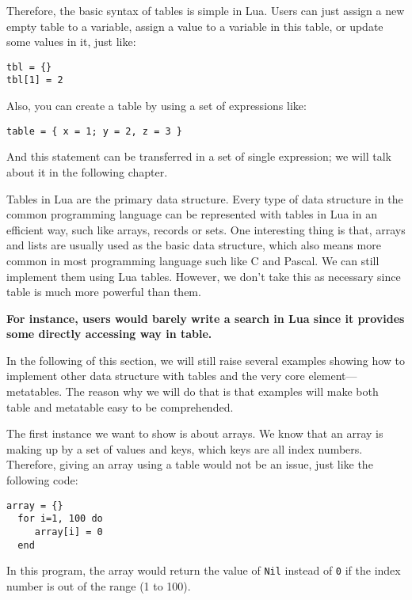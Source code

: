 \documentclass{article}
\begin{document}
Therefore, the basic syntax of tables is simple in Lua. Users can just assign a new empty table to a variable, assign a value to a variable in this table, or update some values in it, just like:
\begin{flushleft}
\tt tbl = \{\} \\
\tt tbl[1] = 2 \\
\end{flushleft}
Also, you can create a table by using a set of expressions like:
\begin{flushleft}
\tt table = \{ x = 1; y = 2, z = 3 \} \\
\end{flushleft}
And this statement can be transferred in a set of single expression; we will talk about it in the following chapter.

Tables in Lua are the primary data structure. Every type of data structure in the common programming language can be represented with tables in Lua in an efficient way, such like arrays, records or sets. One interesting thing is that, arrays and lists are usually used as the basic data structure, which also means more common in most programming language such like C and Pascal. We can still implement them using Lua tables. However, we don't take this as necessary since table is much more powerful than them. 

{\bf For instance, users would barely write a search in Lua since it provides some directly accessing way in table.}

In the following of this section, we will still raise several examples showing how to implement other data structure with tables and the very core element---metatables. The reason why we will do that is that examples will make both table and metatable easy to be comprehended.

The first instance we want to show is about arrays. We know that an array is making up by a set of values and keys, which keys are all index numbers. Therefore, giving an array using a table would not be an issue, just like the following code:
\begin{flushleft}
\tt array = \{\} \\
\tt ~~for i=1, 100 do\\
\tt ~~~~ array[i] = 0\\
\tt ~~end\\
\end{flushleft}
In this program, the array would return the value of {\tt Nil} instead of {\tt 0} if the index number is out of the range (1 to 100).
\end{document}

